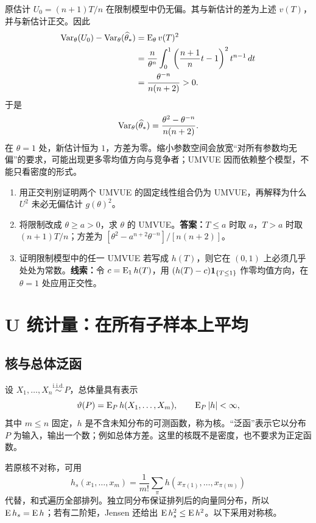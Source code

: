 原估计 $U_0=(n+1)T/n$ 在限制模型中仍无偏。其与新估计的差为上述 $v(T)$，并与新估计正交。因此
\begin{align*}
 \operatorname{Var}_\theta(U_0)-\operatorname{Var}_\theta(\widehat\theta_*)
 &=\operatorname{E}_\theta v(T)^2\\
 &=\frac n{\theta^n}\int_0^1
   \left(\frac{n+1}{n}t-1\right)^2t^{n-1}\,dt\\
 &=\frac{\theta^{-n}}{n(n+2)}>0.
\end{align*}
于是
\[
 \operatorname{Var}_\theta(\widehat\theta_*)
 =\frac{\theta^2-\theta^{-n}}{n(n+2)}.
\]
在 $\theta=1$ 处，新估计恒为 $1$，方差为零。缩小参数空间会放宽“对所有参数均无偏”的要求，可能出现更多零均值方向与竞争者；UMVUE 因而依赖整个模型，不能只看密度的形式。

\begin{notebox}[练习与证明线索]
\begin{enumerate}
 \item 用正交判别证明两个 UMVUE 的固定线性组合仍为 UMVUE，再解释为什么 $U^2$ 未必无偏估计 $g(\theta)^2$。
 \item 将限制改成 $\theta\geq a>0$，求 $\theta$ 的 UMVUE。\textbf{答案：}$T\leq a$ 时取 $a$，$T>a$ 时取 $(n+1)T/n$；方差为 $[\theta^2-a^{n+2}\theta^{-n}]/[n(n+2)]$。
 \item 证明限制模型中的任一 UMVUE 若写成 $h(T)$，则它在 $(0,1)$ 上必须几乎处处为常数。\textbf{线索：}令 $c=\operatorname{E}_1h(T)$，用 $(h(T)-c)\mathbf 1_{\{T\leq1\}}$ 作零均值方向，在 $\theta=1$ 处应用正交性。
\end{enumerate}
\end{notebox}

\section{U 统计量：在所有子样本上平均}

\subsection{核与总体泛函}

设 $X_1,\ldots,X_n\overset{\mathrm{i.i.d.}}\sim P$，总体量具有表示
\[
 \vartheta(P)=\operatorname{E}_P h(X_1,\ldots,X_m),\qquad \operatorname{E}_P|h|<\infty,
\]
其中 $m\leq n$ 固定，$h$ 是不含未知分布的可测函数，称为核。“泛函”表示它以分布 $P$ 为输入，输出一个数；例如总体方差。这里的核既不是密度，也不要求为正定函数。

若原核不对称，可用
\[
 h_s(x_1,\ldots,x_m)=\frac1{m!}\sum_\pi
 h(x_{\pi(1)},\ldots,x_{\pi(m)})
\]
代替，和式遍历全部排列。独立同分布保证排列后的向量同分布，所以 $\operatorname{E} h_s=\operatorname{E} h$；若有二阶矩，Jensen 还给出 $\operatorname{E} h_s^2\leq\operatorname{E} h^2$。以下采用对称核。

